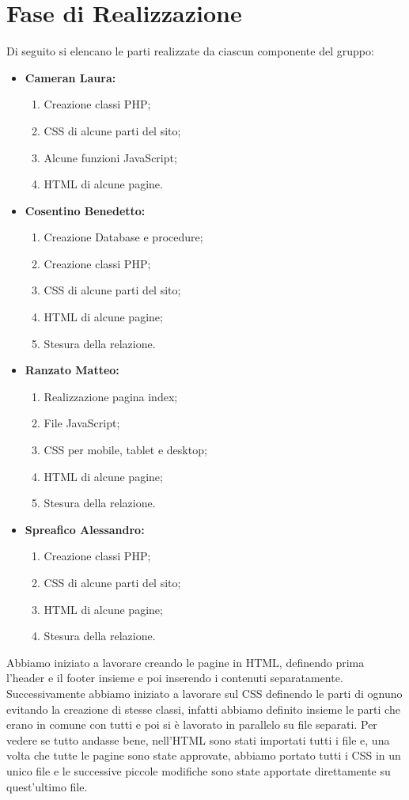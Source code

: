\section{Fase di Realizzazione}
Di seguito si elencano le parti realizzate da ciascun componente del gruppo:
\begin{itemize}
	\item \textbf{Cameran Laura:}
	\begin{enumerate}
		\item Creazione classi PHP;
		\item CSS di alcune parti del sito;
		\item Alcune funzioni JavaScript;
		\item HTML di alcune pagine.
	\end{enumerate}
	\item \textbf{Cosentino Benedetto:}
	\begin{enumerate}
		\item Creazione Database e procedure;
		\item Creazione classi PHP;
		\item CSS di alcune parti del sito;
		\item HTML di alcune pagine;
		\item Stesura della relazione.
	\end{enumerate}
	\item \textbf{Ranzato Matteo:}
	\begin{enumerate}
		\item Realizzazione pagina index;
		\item File JavaScript;
		\item CSS per mobile, tablet e desktop;
		\item HTML di alcune pagine;
		\item Stesura della relazione.
	\end{enumerate}
	\item \textbf{Spreafico Alessandro:}
	\begin{enumerate}
		\item Creazione classi PHP;
		\item CSS di alcune parti del sito;
		\item HTML di alcune pagine;
		\item Stesura della relazione.
	\end{enumerate}
\end{itemize}
Abbiamo iniziato a lavorare creando le pagine in HTML, definendo prima l'header e il footer insieme e poi inserendo i contenuti separatamente. Successivamente abbiamo iniziato a lavorare sul CSS definendo le parti di ognuno evitando la creazione di stesse classi, infatti abbiamo definito insieme le parti che erano in comune con tutti e poi si è lavorato in parallelo su file separati. Per vedere se tutto andasse bene, nell'HTML sono stati importati tutti i file e, una volta che tutte le pagine sono state approvate, abbiamo portato tutti i CSS in un unico file e le successive piccole modifiche sono state apportate direttamente su quest'ultimo file.\\

